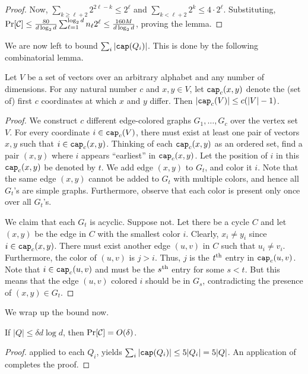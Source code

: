 \begin{proof}
\noindent
Now, $\sum_{k\geq \ell+2} 2^{2\ell - k} \leq 2^\ell$ and $\sum_{k < \ell+2} 2^k \leq 4\cdot 2^\ell$. Substituting,
$
\Pr[{\cal C}] \leq \frac{80}{d\log_2 d} \sum_{\ell=1}^{\log_2 d} n_\ell 2^\ell \leq \frac{160M}{d\log_2 d}
$, proving the lemma.
\end{proof}

\noindent We are now left to bound $\sum_i |\mathtt{cap}(Q_i)|$. This is done by the following combinatorial lemma.

\begin{lemma}\label{lem:comb}
Let $V$ be a set of vectors over an arbitrary alphabet
and any number of dimensions. For any natural number $c$
and $x,y \in V$,
let $\mathtt{cap}_c(x,y)$ denote the (set of) first $c$ coordinates
at which $x$ and $y$ differ. Then $|\mathtt{cap}_c(V)| \leq c(|V|-1)$.
\end{lemma}

\begin{proof}
We construct $c$ different edge-colored graphs $G_1, \ldots, G_c$ over the vertex set $V$. 
For every coordinate $i\in \mathtt{cap}_c(V)$, there must exist at least one pair of
vectors $x,y$ such that $i \in \mathtt{cap}_c(x,y)$. Thinking
of each $\mathtt{cap}_c(x,y)$ as an ordered set, find a pair
$(x,y)$ where $i$ appears ``earliest'' in $\mathtt{cap}_c(x,y)$.
Let the position of $i$ in this $\mathtt{cap}_c(x,y)$ be denoted by $t$.
We add edge $(x,y)$ to $G_t$, and color it $i$.
Note that the same edge $(x,y)$ cannot be added to $G_t$
with multiple colors, and hence all $G_t$'s are simple graphs.
Furthermore, observe that each color is present only
once over all $G_t$'s.

We claim that each $G_t$ is acyclic. Suppose not. Let there be a cycle $C$ and let $(x,y)$ be the edge in $C$ with the smallest color $i$. Clearly, $x_i \neq y_i$ since $i \in \mathtt{cap}_c(x,y)$. There must exist another edge $(u,v)$ in $C$
such that $u_i \neq v_i$. Furthermore, the color of $(u,v)$
is $j > i$. Thus, $j$ is the ${t}^{\mathrm{th}}$ entry in $\mathtt{cap}_c(u,v)$.
Note that $i \in \mathtt{cap}_c(u,v)$ and must be the ${s}^{\mathrm{th}}$ entry
for some $s < t$. But this means that the edge $(u,v)$
colored $i$ should be in $G_s$, contradicting
the presence of $(x,y) \in G_t$.
\end{proof}

\noindent We wrap up the bound now.

\begin{lemma}\label{lem:C}
	If $|Q|\leq \delta d\log d$, then $\Pr[{\cal C}] = O(\delta)$.
\end{lemma}
\begin{proof}
 applied to each $Q_i$, yields
$\sum_i |\mathtt{cap}(Q_i)| \leq 5|Q_i| = 5|Q|$.  An application of
 completes the proof.
\end{proof}
